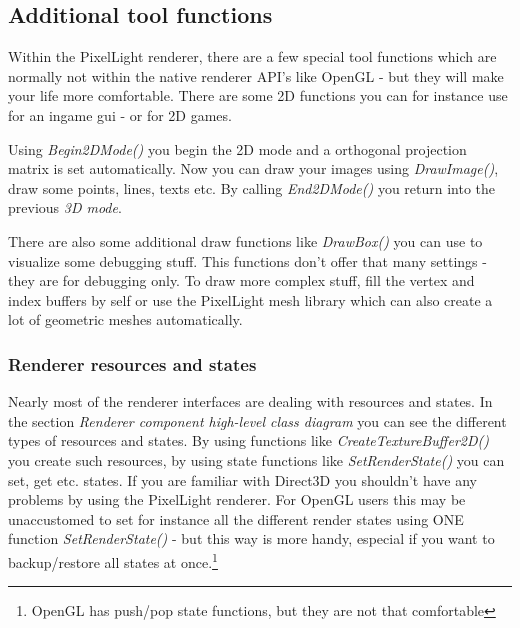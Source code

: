 \subsection{Additional tool functions}
Within the PixelLight renderer, there are a few special tool functions which are normally not within the native renderer API's like OpenGL - but they will make your life more comfortable. There are some 2D functions you can for instance use for an ingame gui - or for 2D games.

Using \emph{Begin2DMode()} you begin the 2D mode and a orthogonal projection matrix is set automatically. Now you can draw your images using \emph{DrawImage()}, draw some points, lines, texts etc. By calling \emph{End2DMode()} you return into the previous \emph{3D mode}.

There are also some additional draw functions like \emph{DrawBox()} you can use to visualize some debugging stuff. This functions don't offer that many settings - they are for debugging only. To draw more complex stuff, fill the vertex and index buffers by self or use the PixelLight mesh library which can also create a lot of geometric meshes automatically.



\subsubsection{Renderer resources and states}
Nearly most of the renderer interfaces are dealing with resources and states. In the section \emph{Renderer component high-level class diagram} you can see the different types of resources and states. By using functions like \emph{CreateTextureBuffer2D()} you create such resources, by using state functions like \emph{SetRenderState()} you can set, get etc. states. If you are familiar with Direct3D you shouldn't have any problems by using the PixelLight renderer. For OpenGL users this may be unaccustomed to set for instance all the different render states using ONE function \emph{SetRenderState()} - but this way is more handy, especial if you want to backup/restore all states at once.\footnote{OpenGL has push/pop state functions, but they are not that comfortable}



